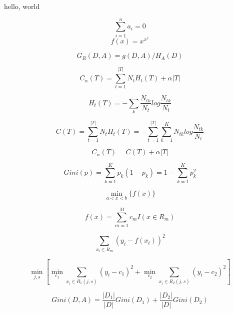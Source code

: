 \documentclass{article}
\begin{document}
hello, world

$$\sum_{i=1}^n a_i=0$$
$$f(x)=x^{x^x}$$

$$G_R(D,A)=g(D,A)/H_A(D)$$

$$C_\alpha(T)=\sum_{t=1}^{|T|} N_tH_t(T)+\alpha|T|$$

$$H_t(T)=-\sum_k \frac{N_{tk}}{N_t}log\frac{N_{tk}}{N_t}$$

$$C(T)=\sum_{t=1}^{|T|} N_t H_t (T)=-\sum_{t=1}^{|T|} \sum_{k=1}^{K} N_{tk} log \frac {N_{tk}}{N_t}$$

$$C_\alpha(T)=C(T)+\alpha|T|$$

$$Gini(p)=\sum_{k=1}^{K} p_k (1-p_k)=1-\sum_{k=1}^K p_{k}^{2}$$

$$\min \limits_{a<x<b}\{f(x)\}$$

$$f(x)=\sum_{m=1}^M c_m I(x\in R_m)$$

$$\sum_{x_i\in R_m} (y_i-f(x_i))^2$$

$$\min \limits_{j,s} [\min \limits_{c_1} \sum_{x_i\in R_1(j,s)} (y_i-c_1)^2+\min \limits_{c_2} \sum_{x_i \in R_2(j,s)} (y_i-c_2)^2]$$

$$Gini(D,A)=\frac{|D_1|}{|D|} Gini(D_1)+\frac{|D_2|}{|D|}Gini(D_2)$$
\end{document}
